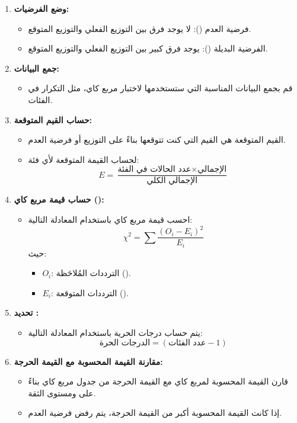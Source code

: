 \begin{enumerate}
	\item \textbf{وضع الفرضيات:}
	\begin{itemize}
		\item فرضية العدم (): لا يوجد فرق بين التوزيع الفعلي والتوزيع المتوقع.
		\item الفرضية البديلة (): يوجد فرق كبير بين التوزيع الفعلي والتوزيع المتوقع.
	\end{itemize}
	
	\item \textbf{جمع البيانات:}
	\begin{itemize}
		\item قم بجمع البيانات المناسبة التي ستستخدمها لاختبار مربع كاي، مثل التكرار في الفئات.
	\end{itemize}
	
	\item \textbf{حساب القيم المتوقعة:}
	\begin{itemize}
		\item القيم المتوقعة هي القيم التي كنت تتوقعها بناءً على التوزيع أو فرضية العدم.
		\item لحساب القيمة المتوقعة لأي فئة:
		\[
		E = \frac{\text{عدد الحالات في الفئة} \times \text{الإجمالي}}{\text{الإجمالي الكلي}}
		\]
	\end{itemize}
	
	\item \textbf{حساب قيمة مربع كاي ():}
	\begin{itemize}
		\item احسب قيمة مربع كاي باستخدام المعادلة التالية:
		\[
		\chi^2 = \sum \frac{(O_i - E_i)^2}{E_i}
		\]
		حيث:
		\begin{itemize}
			\item \(O_i\): الترددات المُلاحَظة ().
			\item \(E_i\): الترددات المتوقعة ().
		\end{itemize}
	\end{itemize}
	
	\item \textbf{تحديد :}
	\begin{itemize}
		\item يتم حساب درجات الحرية باستخدام المعادلة التالية:
		\[
		\text{الدرجات الحرة} = (\text{عدد الفئات} - 1)
		\]
	\end{itemize}
	
	\item \textbf{مقارنة القيمة المحسوبة مع القيمة الحرجة:}
	\begin{itemize}
		\item قارن القيمة المحسوبة لمربع كاي مع القيمة الحرجة من جدول مربع كاي بناءً على  ومستوى الثقة.
		\item إذا كانت القيمة المحسوبة أكبر من القيمة الحرجة، يتم رفض فرضية العدم.
	\end{itemize}
	

\end{enumerate}
